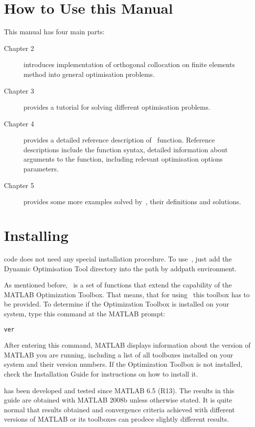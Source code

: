 \section{How to Use this Manual}
\label{sec:howtouseman}

This manual has four main parts:
\begin{description}
\item[Chapter 2] introduces implementation of orthogonal collocation
  on finite elements method into general optimisation problems.
\item[Chapter 3] provides a tutorial for solving different
  optimisation problems.
\item[Chapter 4] provides a detailed reference description
  of~ function. Reference descriptions include the
  function syntax, detailed information about arguments to the
  function, including relevant optimisation options parameters.
\item[Chapter 5] provides some more examples solved by~,
  their definitions and solutions.
\end{description}

\section{Installing~}
\label{sec:instdynopt}

 code does not need any special installation procedure. To
use~, just add the Dynamic Optimisation Tool directory
 into the path by addpath environment. 

As mentioned before,~ is a set of functions that extend
the capability of the MATLAB Optimization Toolbox. That means, that
for using~ this toolbox has to be provided. To determine
if the Optimization Toolbox is installed on your system, type this
command at the MATLAB prompt:
\begin{verbatim}
ver
\end{verbatim}
After entering this command, MATLAB displays information about the
version of MATLAB you are running, including a list of all toolboxes
installed on your system and their version numbers.  If the
Optimization Toolbox is not installed, check the Installation Guide
for instructions on how to install it.

 has been developed and tested since MATLAB 6.5 (R13). The
results in this guide are obtained with MATLAB 2008b unless otherwise
stated. It is quite normal that results obtained and convergence
criteria achieved with different versions of MATLAB or its toolboxes
can prodece slightly different results.


